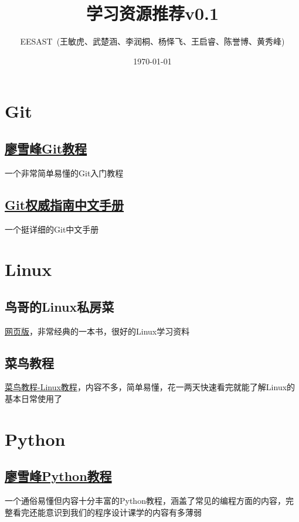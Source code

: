\documentclass{ctexart}
\begin{document}
\title{学习资源推荐v0.1}
\author{EESAST\ (王敏虎、武楚涵、李润桐、杨怿飞、王启睿、陈誉博、黄秀峰)}
\date{\today}
\maketitle

\section{Git}

\subsection{\href{https://www.liaoxuefeng.com/wiki/0013739516305929606dd18361248578c67b8067c8c017b000}{廖雪峰Git教程}}
一个非常简单易懂的Git入门教程

\subsection{\href{http://iissnan.com/progit/html/zh/ch1_0.html}{Git权威指南中文手册}}
一个挺详细的Git中文手册

\section{Linux}

\subsection{鸟哥的Linux私房菜}
\href{http://linux.vbird.org}{网页版}，非常经典的一本书，很好的Linux学习资料

\subsection{菜鸟教程}
\href{http://www.runoob.com/linux/linux-tutorial.html}{菜鸟教程-Linux教程}，内容不多，简单易懂，花一两天快速看完就能了解Linux的基本日常使用了


\section{Python}
\subsection{\href{https://www.liaoxuefeng.com/wiki/0014316089557264a6b348958f449949df42a6d3a2e542c000}{廖雪峰Python教程}}
一个通俗易懂但内容十分丰富的Python教程，涵盖了常见的编程方面的内容，完整看完还能意识到我们的程序设计课学的内容有多薄弱
\end{document}
